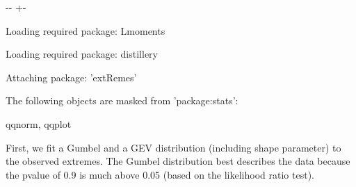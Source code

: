 \documentclass[letterpaper,10pt,english]{sphinxmanual}
\newlength\nbsphinxcodecellspacing
\begin{document}
{

\kern-\sphinxverbatimsmallskipamount\kern-\baselineskip
\kern+\FrameHeightAdjust\kern-\fboxrule
\vspace{\nbsphinxcodecellspacing}

\begin{sphinxVerbatim}[commandchars=\\\{\}]
Loading required package: Lmoments

Loading required package: distillery


Attaching package: 'extRemes'


The following objects are masked from 'package:stats':

    qqnorm, qqplot


\end{sphinxVerbatim}
}

First, we fit a Gumbel and a GEV distribution (including shape parameter) to the observed extremes. The Gumbel distribution best describes the data because the p\sphinxhyphen{}value of 0.9 is much above 0.05 (based on the likelihood ratio test).

{
\begin{sphinxVerbatim}[commandchars=\\\{\}]
\llap{\color{nbsphinxin}[9]:\,\hspace{\fboxrule}\hspace{\fboxsep}}    
                      
    
                      
 
\end{sphinxVerbatim}
}
\end{document}
